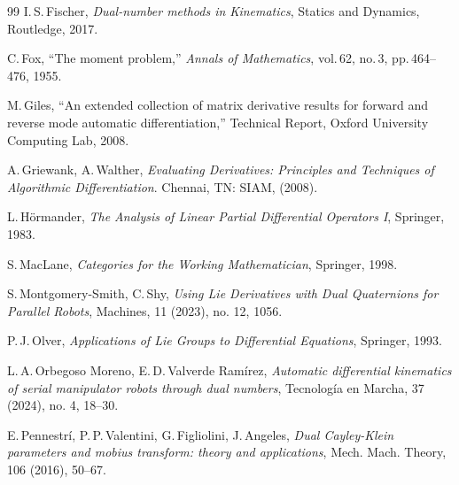 \documentclass[11pt,a4paper,fleqn]{article}
\numberwithin{equation}{section}
\numberwithin{lemma}{section}
\numberwithin{theorem}{section}
\numberwithin{corollary}{section}
\begin{document}
\begin{thebibliography}{99}
 I.\,S.\,Fischer, \textit{Dual-number methods in Kinematics}, Statics and Dynamics, Routledge, 2017.


 C.\,Fox, “The moment problem,” \textit{Annals of Mathematics}, vol.\,62, no.\,3, pp.\,464--476, 1955.


 M.\,Giles, “An extended collection of matrix derivative results for forward and reverse mode automatic differentiation,” Technical Report, Oxford University Computing Lab, 2008.

 A.\,Griewank,  A.\,Walther,   \textit{Evaluating Derivatives: Principles and Techniques of Algorithmic Differentiation}. Chennai, TN: SIAM, (2008).

 L.\,H\"ormander, \textit{The Analysis of Linear Partial Differential Operators I}, Springer, 1983.


 S.\,MacLane, \textit{Categories for the Working Mathematician}, Springer, 1998.

 S.\,Montgomery-Smith, C.\,Shy,  \textit{Using Lie Derivatives with Dual Quaternions for Parallel Robots}, Machines, 11 (2023), no. 12, 1056.

 P.\,J.\,Olver, \textit{Applications of Lie Groups to Differential Equations}, Springer, 1993.

 L.\,A.\,Orbegoso Moreno,   E.\,D.\,Valverde Ram\'irez, \textit{Automatic differential kinematics of serial manipulator robots through dual numbers}, Tecnología en Marcha, 37  (2024), no. 4, 18--30.

 E.\,Pennestr{\'i}, P.\,P.\,Valentini, G.\,Figliolini, J.\,Angeles,  \textit{Dual Cayley-Klein parameters and mobius transform: theory and applications}, Mech. Mach. Theory, 106 (2016), 50--67.


\end{thebibliography}
\end{document}

